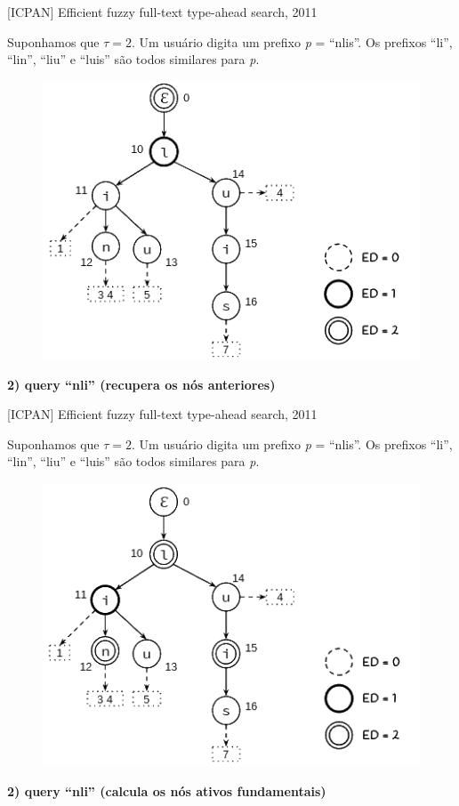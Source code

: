 \documentclass[11pt]{beamer}
\begin{document}
\begin{frame}{[ICPAN] Efficient fuzzy full-text type-ahead search, 2011}
    
    \small
    Suponhamos que $\tau = 2$. Um usuário digita um prefixo \textit{p} = ``nlis''. Os prefixos ``li'', ``lin'', ``liu'' e ``luis'' são todos similares para \textit{p}.

    \begin{figure}
      \includegraphics[scale=0.50]{pictures/ipcan_3.png}
      \centering
    \end{figure}
    
    \textbf{2) query ``nli'' (recupera os nós anteriores)}
    
\end{frame}

\begin{frame}{[ICPAN] Efficient fuzzy full-text type-ahead search, 2011}
    
    \small
    Suponhamos que $\tau = 2$. Um usuário digita um prefixo \textit{p} = ``nlis''. Os prefixos ``li'', ``lin'', ``liu'' e ``luis'' são todos similares para \textit{p}.

    \begin{figure}
      \includegraphics[scale=0.50]{pictures/icpan_4.png}
      \centering
    \end{figure}
    
    \textbf{2) query ``nli'' (calcula os nós ativos fundamentais)}
    
\end{frame}
\end{document}
